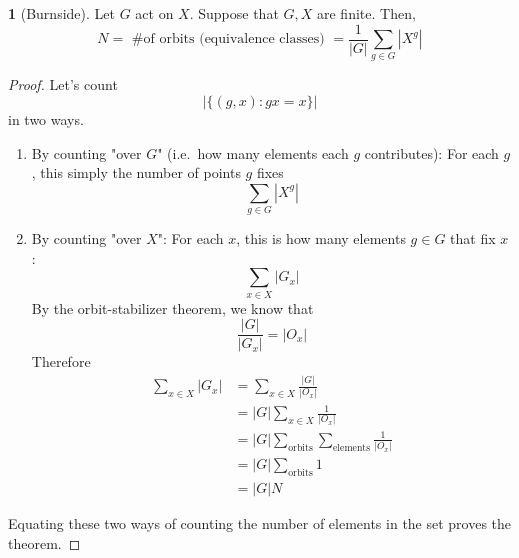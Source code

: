 \documentclass[12pt]{article}
\theoremstyle{definition}
\newtheorem{theorem}{\color{ForestGreen}{\textbf{Theorem}}}
\theoremstyle{definition}
\begin{document}
\begin{theorem}[Burnside]
Let $G$ act on $X$. Suppose that $G,X$ are finite. Then, 
\begin{equation}
	N = \text{ \# of orbits (equivalence classes) } = \frac{1}{|G|} \sum_{g\in G} |X^g|
\end{equation}
\end{theorem}
\begin{proof}
	Let's count 
	\begin{equation}
		|\{(g,x): gx = x \}|
	\end{equation}
	in two ways.
	\begin{enumerate}
		\item By counting "over $G$" (i.e.\ how many elements each $g$ contributes): For each $g$, this simply the number of points $g$ fixes
		\begin{equation}
			\sum_{g \in G} |X^g|
		\end{equation}
		\item By counting "over $X$": For each $x$, this is how many elements $g \in G$ that fix $x$:
		\begin{equation}
			\sum_{x\in X} |G_x|
		\end{equation}
		By the orbit-stabilizer theorem, we know that 
		\begin{equation}
			\frac{|G|}{|G_x|} = |O_x|
		\end{equation}
		Therefore
		\begin{align*}
		\sum_{x\in X} |G_x| &= \sum_{x\in X} \frac{|G|}{|O_x|} \\
		&= |G| \sum_{x\in X} \frac{1}{|O_x|} \\
		&= |G| \sum_{\text{orbits}} \sum_{\text{elements}} \frac{1}{|O_x|} \\
		&= |G| \sum_{\text{orbits}} 1 \\
		&= |G| N
		\end{align*}
	\end{enumerate}
	Equating these two ways of counting the number of elements in the set proves the theorem. 
\end{proof}
\end{document}
